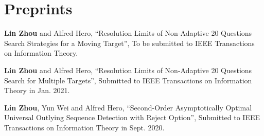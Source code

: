 \documentclass[12pt]{article} %
\begin{document}
\section{Preprints}
\begin{etaremune}
\item \textbf{Lin Zhou} and Alfred Hero, ``Resolution Limits of Non-Adaptive 20 Questions Search Strategies for a Moving Target'', To be submitted to IEEE Transactions on Information Theory.
\item \textbf{Lin Zhou} and Alfred Hero, ``Resolution Limits of Non-Adaptive 20 Questions Search for Multiple Targets'', Submitted to IEEE Transactions on Information Theory in Jan. 2021.
\item \textbf{Lin Zhou}, Yun Wei and Alfred Hero, ``Second-Order Asymptotically Optimal Universal Outlying Sequence Detection with Reject Option'', Submitted to IEEE Transactions on Information Theory in Sept. 2020.
\end{etaremune}
\end{document}
